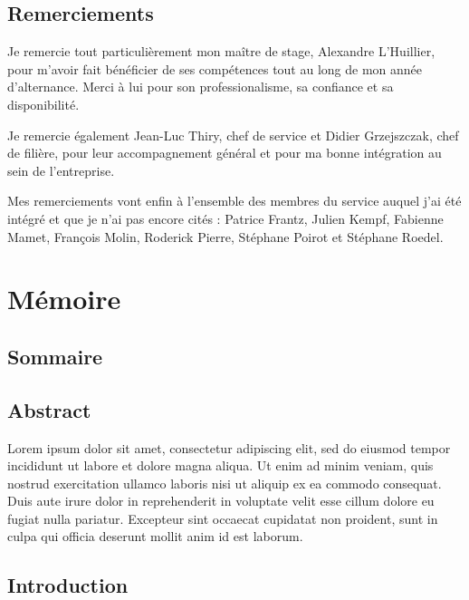 \documentclass[a4paper, 12pt]{report}
\begin{document}
\chapter*{Remerciements}
\thispagestyle{empty}

Je remercie tout particulièrement mon maître de stage, Alexandre L'Huillier, pour m'avoir fait bénéficier de ses compétences tout au long de mon année d'alternance. Merci à lui pour son professionalisme, sa confiance et sa disponibilité.

Je remercie également Jean-Luc Thiry, chef de service et Didier Grzejszczak, chef de filière, pour leur accompagnement général et pour ma bonne intégration au sein de l'entreprise.

Mes remerciements vont enfin à l'ensemble des membres du service auquel j'ai été intégré et que je n'ai pas encore cités : Patrice Frantz, Julien Kempf, Fabienne Mamet, François Molin, Roderick Pierre, Stéphane Poirot et Stéphane Roedel.

\part{Mémoire}
\renewcommand{\clearpage}{}
\chapter*{Sommaire}
\renewcommand\ptctitle{}
\parttoc
\thispagestyle{empty}
\renewcommand{\clearpage}{\newpage}
\clearpage

\chapter*{Abstract}

Lorem ipsum dolor sit amet, consectetur adipiscing elit, sed do eiusmod tempor incididunt ut labore et dolore magna aliqua. Ut enim ad minim veniam, quis nostrud exercitation ullamco laboris nisi ut aliquip ex ea commodo consequat. Duis aute irure dolor in reprehenderit in voluptate velit esse cillum dolore eu fugiat nulla pariatur. Excepteur sint occaecat cupidatat non proident, sunt in culpa qui officia deserunt mollit anim id est laborum.

\chapter*{Introduction}
\end{document}
